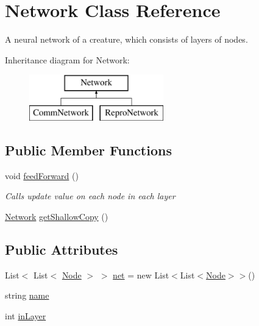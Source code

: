 \hypertarget{class_network}{}\section{Network Class Reference}
\label{class_network}


A neural network of a creature, which consists of layers of nodes.  


Inheritance diagram for Network\+:\begin{figure}[H]
\begin{center}
\leavevmode
\includegraphics[height=2.000000cm]{class_network}
\end{center}
\end{figure}
\subsection*{Public Member Functions}
\begin{DoxyCompactItemize}
\item 
void \mbox{\hyperlink{class_network_a8285772739069a17a6cf3407208c25cb}{feed\+Forward}} ()
\begin{DoxyCompactList}\small\item\em Calls update value on each node in each layer \end{DoxyCompactList}\item 
\mbox{\hyperlink{class_network}{Network}} \mbox{\hyperlink{class_network_a08970b95e111e12a0463719c959db247}{get\+Shallow\+Copy}} ()
\end{DoxyCompactItemize}
\subsection*{Public Attributes}
\begin{DoxyCompactItemize}
\item 
List$<$ List$<$ \mbox{\hyperlink{class_node}{Node}} $>$ $>$ \mbox{\hyperlink{class_network_a5575fb3cc8b86da6ff8ffed15634e4b4}{net}} = new List$<$List$<$\mbox{\hyperlink{class_node}{Node}}$>$$>$()
\item 
string \mbox{\hyperlink{class_network_a9d47011c0cdd1c2c2a17f487fc20aa74}{name}}
\item 
int \mbox{\hyperlink{class_network_a28e1ac9d80508cd8bb52624e4e1efede}{in\+Layer}}
\end{DoxyCompactItemize}



